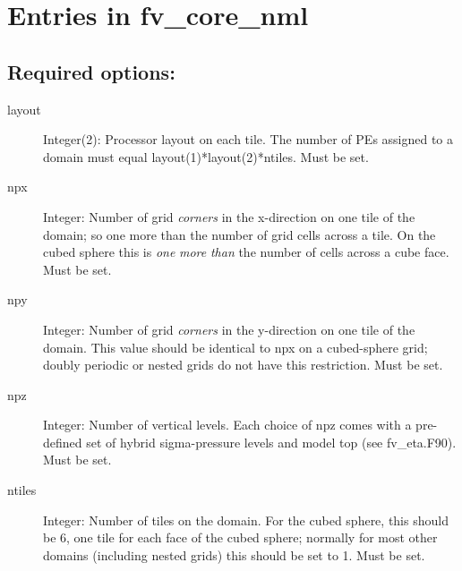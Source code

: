 \documentclass[12pt,letterpaper]{book}
\newcommand{\redtext}[1]{\textcolor{red}{[#1]}}  %
\begin{document}
\newcommand{\true}{\texttt{.true.}}
\newcommand{\false}{\texttt{.false.}}


                                    
                                    

                                                                                                                                        
\section{Entries in fv\_core\_nml}


\subsection{Required options:}

\begin{description}
\item[layout] Integer(2): Processor layout on each tile. The number of PEs assigned to a domain must equal layout(1)*layout(2)*ntiles. Must be set. 


\item[npx] Integer: Number of grid \textit{corners} in the x-direction on one tile of the domain; so one more than the number of grid cells across a tile. On the cubed sphere this is \textit{one} \textit{more} \textit{than} the number of cells across a cube face. Must be set. 


\item[npy] Integer: Number of grid \textit{corners} in the y-direction on one tile of the domain. This value should be identical to npx on a cubed-sphere grid; doubly periodic or nested grids do not have this restriction. Must be set. 


\item[npz] Integer: Number of vertical levels. Each choice of npz comes with a pre-defined set of hybrid sigma-pressure levels and model top 
(see fv\_eta.F90). Must be set. 


\item[ntiles] Integer: Number of tiles on the domain. For the cubed sphere, this should be 
6, one tile for each face of the cubed sphere; normally for most other domains 
(including nested grids) this should be set to 1. Must be set. 

\end{description}
\end{document}
